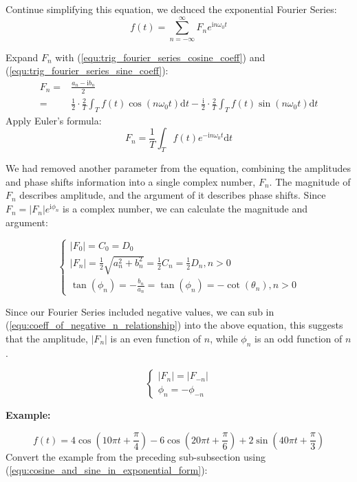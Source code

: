 Continue simplifying this equation, we deduced the exponential Fourier Series:
\begin{equation}
    f(t) = \sum_{n=-\infty}^{\infty}F_ne^{\mathrm{i}n\omega_0t}
\end{equation}

Expand $F_n$ with (\ref{equ:trig_fourier_series_cosine_coeff}) and (\ref{equ:trig_fourier_series_sine_coeff}):
$$\begin{aligned} 
    F_n 
    =& \frac{a_n-\mathrm{i}b_n}{2}    \\
    =& \frac{1}{2}\cdot\frac{2}{T} \int_{T} f(t)\cos(n\omega_0t) \mathrm{d}t   
        - \frac{\mathrm{i}}{2}\cdot\frac{2}{T} \int_{T} f(t)\sin(n\omega_0t) \mathrm{d}t
\end{aligned}$$
\indent Apply Euler's formula:
\begin{equation}
    F_n = \frac{1}{T}\int_{T} f(t)e^{-\mathrm{i}n\omega_0t} \mathrm{d}t
    \label{equ:fourier_series_exponent_coeff}
\end{equation}

\indent We had removed another parameter from the equation, combining the amplitudes and phase shifts information 
into a single complex number, $F_n$. The magnitude of $F_n$ describes amplitude, 
and the argument of it describes phase shifts.
Since $F_n = \left|F_n\right|e^{\mathrm{i}\phi_n}$ is a complex number, 
we can calculate the magnitude and argument:

$$\begin{cases}
    \left|F_0\right| = C_0 = D_0  \\
    \left|F_n\right| = \frac{1}{2}\sqrt{a_n^2+b_n^2} = \frac{1}{2}C_n = \frac{1}{2}D_n , n > 0   \\
    \tan(\phi_n) = -\frac{b_n}{a_n} = \tan(\phi_n) = -\cot(\theta_n) , n > 0
\end{cases}$$

\indent Since our Fourier Series included negative values, we can sub in ({\ref{equ:coeff_of_negative_n_relationship}}) 
into the above equation, this suggests that the amplitude, $\left|F_n\right|$ is an even function of $n$, 
while $\phi_n$ is an odd function of $n$. 

$$\begin{cases}
    \left|F_n\right| = \left|F_{-n}\right| \\
    \phi_n = -\phi_{-n}
\end{cases}$$


\noindent\textbf{Example:}

$$f(t) = 4\cos(10\pi t+\frac{\pi}{4}) - 6\cos(20\pi t+\frac{\pi}{6}) + 2\sin(40\pi t+\frac{\pi}{3})$$
\indent Convert the example from the preceding sub-subsection using (\ref{equ:cosine_and_sine_in_exponential_form}):

